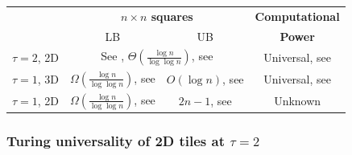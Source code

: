 	\begin{center}
	\begin{tabular}{|| c || c | c | c ||}
		\hline\hline
		~ & \multicolumn{2}{c|}{\bf $n\times n$ squares} & {\bf Computational} \\
		~ & \multicolumn{1}{c}{LB} & \multicolumn{1}{c|}{UB} & {\bf Power}\\
		\hline
		$\tau=2$, 2D & \multicolumn{2}{c|}{See \cite{square_lb}, $\Theta(\frac{\log n}{\log\log n})$, see \cite{square_ub}} & Universal, see \cite{winfree_phd} \\
		\hline
		$\tau=1$, 3D & $\Omega(\frac{\log n}{\log\log n})$, see \cite{square_lb} & $O(\log n)$, see \cite{cook_temp1} & Universal, see \cite{cook_temp1} \\
		\hline
		$\tau=1$, 2D & $\Omega(\frac{\log n}{\log\log n})$, see \cite{square_lb} & $2n-1$, see \cite{square_lb} & Unknown \\
		\hline\hline
	\end{tabular}
	\end{center}
	
	\subsubsection{Turing universality of 2D tiles at $\tau=2$}
		
